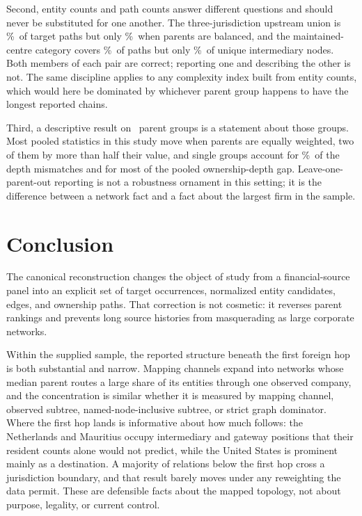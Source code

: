 \documentclass[11pt]{article}
\newcommand{\pct}{\%}
\begin{document}
Second, entity counts and path counts answer different questions and should
never be substituted for one another. The three-jurisdiction upstream union is
\TopThreePct\pct\ of target paths but only \TopThreeEqualPct\pct\ when parents
are balanced, and the maintained-centre category covers \DeclaredCentrePct\pct\
of paths but only \DeclaredCentreNodePct\pct\ of unique intermediary nodes.
Both members of each pair are correct; reporting one and describing the other
is not. The same discipline applies to any complexity index built from entity
counts, which would here be dominated by whichever parent group happens to have
the longest reported chains.

Third, a descriptive result on \Parents\ parent groups is a statement about
those groups. Most pooled statistics in this study move when parents are equally
weighted, two of them by more than half their value, and single groups account
for \MothersonMismatchShare\pct\ of the depth mismatches and for most of the
pooled ownership-depth gap. Leave-one-parent-out
reporting is not a robustness ornament in this setting; it is the difference
between a network fact and a fact about the largest firm in the sample.

\section{Conclusion}

The canonical reconstruction changes the object of study from a
financial-source panel into an explicit set of target occurrences, normalized
entity candidates, edges, and ownership paths. That correction is not cosmetic:
it reverses parent rankings and prevents long source histories from
masquerading as large corporate networks.

Within the supplied sample, the reported structure beneath the first foreign
hop is both substantial and narrow. Mapping channels expand into networks whose
median parent routes a large share of its entities through one observed
company, and the concentration is similar whether it is measured by mapping
channel, observed subtree, named-node-inclusive subtree, or strict graph
dominator. Where the first hop lands is informative about how much follows: the
Netherlands and Mauritius occupy intermediary and gateway positions that their
resident counts alone would not predict, while the United States is prominent
mainly as a destination. A majority of relations below the first hop cross a
jurisdiction boundary, and that result barely moves under any reweighting the
data permit. These are defensible facts about the mapped topology, not about
purpose, legality, or current control.
\end{document}
